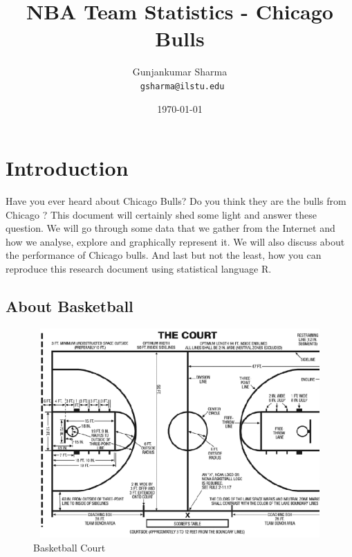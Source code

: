 \documentclass[a4paper]{article}
\begin{document}

\title { NBA Team Statistics - Chicago Bulls}
\author { Gunjankumar Sharma \\
\texttt{ gsharma@ilstu.edu}}
\date{\today} 
\maketitle
\tableofcontents

\vspace{4in}
\section{Introduction}
Have you ever heard about Chicago Bulls? Do you think they are the bulls from Chicago ? This document will certainly shed some light and answer these question. We will go through some data that we gather from the Internet and how we analyse, explore and graphically represent it. We will also discuss about the performance of Chicago bulls. And last but not the least, how you can reproduce this research document using statistical language R.

\vspace{1cm}

\subsection{About Basketball}
\vspace{1cm}
\begin{figure}[ht]
\begin{center}
\includegraphics[width=14cm,height=8cm]{court.png}
\end{center}
\caption{Basketball Court}
\label{Img:court}
\end{figure}
\vspace{1cm}
\end{document}
